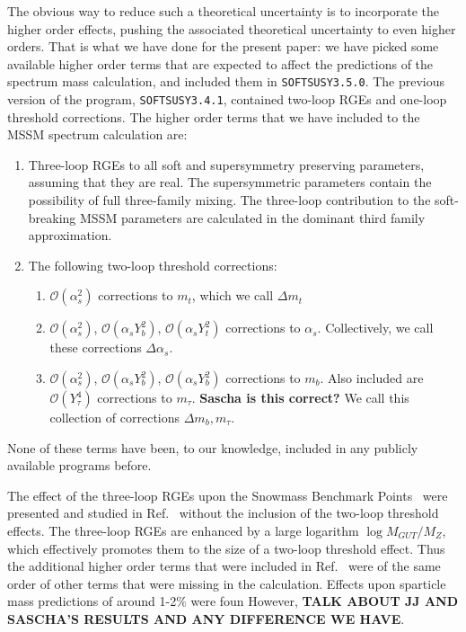 \documentclass[final,3p,times,pdflatex]{elsarticle}
\begin{document}
The obvious way to reduce such a theoretical uncertainty is to incorporate the
higher order effects, pushing the associated theoretical uncertainty to even
higher orders.
That is what we have done for the present paper: we have
picked some available higher order terms that are expected to affect the
predictions of the spectrum mass calculation, and included them in
{\tt SOFTSUSY3.5.0}. The previous version of the program, {\tt SOFTSUSY3.4.1}, 
contained two-loop RGEs and one-loop threshold corrections. 
The higher order terms that we have included to the MSSM spectrum
calculation are: 
\begin{enumerate}
\item
Three-loop RGEs to all soft and supersymmetry preserving parameters, 
assuming that they are real. The supersymmetric parameters contain the
possibility of full three-family mixing. The three-loop contribution to the 
soft-breaking MSSM parameters are calculated in the dominant third family
approximation. 
\item
The following two-loop threshold corrections:
\begin{enumerate}
\item
$\mathcal O(\alpha_s^2)$ corrections to $m_t$, which we call $\Delta m_t$
\item
$\mathcal O(\alpha_s^2)$, $\mathcal O(\alpha_s Y_b^2)$, $\mathcal O(\alpha_s
Y_t^2)$ corrections to $\alpha_s$. Collectively, we call these corrections
$\Delta \alpha_s$.
\item
$\mathcal O(\alpha_s^2)$, $\mathcal O(\alpha_s Y_b^2)$, $\mathcal O(\alpha_s
Y_b^2)$ corrections to $m_b$. Also included are $\mathcal O(Y_\tau^4)$
corrections to $m_\tau$. 
{\bf Sascha is this correct?} We call this
collection of corrections $\Delta m_b, m_\tau$.
\end{enumerate}
\end{enumerate}
None of these terms have been, to our knowledge, included in any publicly
available programs before. 

The effect of the three-loop RGEs upon the Snowmass Benchmark
Points~\cite{Allanach:2002nj} were presented and studied in
Ref.~\cite{Jack:2004ch} 
without the inclusion of the two-loop threshold effects. 
The three-loop RGEs are enhanced by a large logarithm $\log M_{GUT}/M_Z$,
which effectively promotes them to the size of a two-loop threshold effect. 
Thus the additional higher order terms that were included in
Ref.~\cite{Jack:2004ch} were of the same order of other terms that were
missing in the calculation. Effects upon sparticle mass predictions of around 1-2$\%$ were foun
However, 
{\bf TALK ABOUT JJ AND SASCHA'S RESULTS AND ANY DIFFERENCE WE HAVE}.
\end{document}
